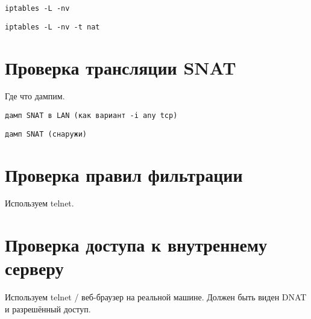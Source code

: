 \documentclass[a4paper,12pt]{article}
\begin{document}
\begin{Verbatim}
iptables -L -nv
\end{Verbatim}

\begin{Verbatim}
iptables -L -nv -t nat
\end{Verbatim}

\section{Проверка трансляции SNAT}

Где что дампим.

\begin{Verbatim}
дамп SNAT в LAN (как вариант -i any tcp)
\end{Verbatim}

\begin{Verbatim}
дамп SNAT (снаружи)
\end{Verbatim}


\section{Проверка правил фильтрации}

Используем telnet.

\section{Проверка доступа к внутреннему серверу}

Используем telnet / веб-браузер на реальной машине. 
Должен быть виден DNAT и разрешённый доступ.
\end{document}
